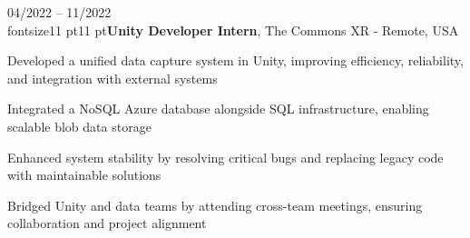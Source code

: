 \begin{twocolentry}{
    04/2022 – 11/2022
}
\\fontsize{11 pt}{11 pt}\textbf{Unity Developer Intern}, The Commons XR - Remote, USA\end{twocolentry}

\vspace{0.10 cm}
\begin{onecolentry}
   \begin{highlights}
       \item Developed a unified data capture system in Unity, improving efficiency, reliability, and integration with external systems  
       \item Integrated a NoSQL Azure database alongside SQL infrastructure, enabling scalable blob data storage
       \item Enhanced system stability by resolving critical bugs and replacing legacy code with maintainable solutions
       \item Bridged Unity and data teams by attending cross-team meetings, ensuring collaboration and project alignment
   \end{highlights}
\end{onecolentry}